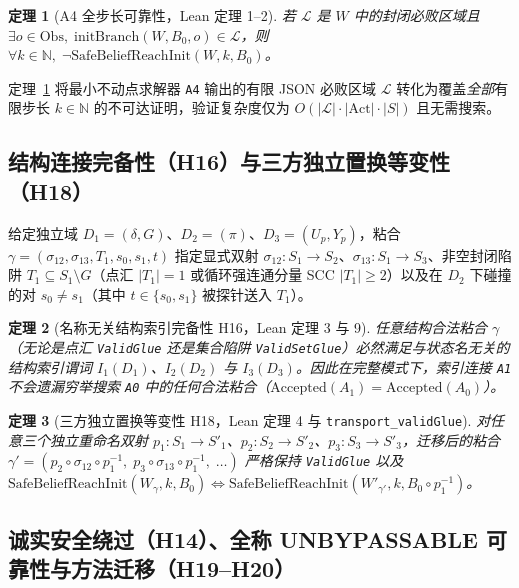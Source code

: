 \documentclass[10pt,a4paper]{article}
\newcommand{\code}[1]{\nolinkurl{#1}}
\newtheorem{theorem}{定理}[section]
\begin{document}
\begin{theorem}[A4 全步长可靠性，Lean 定理 1--2]\label{thm:a4}
若 $\mathcal{L}$ 是 $W$ 中的封闭必败区域且 $\exists o \in \mathrm{Obs},\; \mathrm{initBranch}(W, B_0, o) \in \mathcal{L}$，则 $\forall k \in \mathbb{N},\; \neg\mathrm{SafeBeliefReachInit}(W, k, B_0)$。
\end{theorem}

定理~\ref{thm:a4} 将最小不动点求解器 \code{A4} 输出的有限 JSON 必败区域 $\mathcal{L}$ 转化为覆盖\emph{全部}有限步长 $k \in \mathbb{N}$ 的不可达证明，验证复杂度仅为 $O(|\mathcal{L}|\cdot|\mathrm{Act}|\cdot|S|)$ 且无需搜索。

\subsection{结构连接完备性（H16）与三方独立置换等变性（H18）}

给定独立域 $D_1 = (\delta, G)$、$D_2 = (\pi)$、$D_3 = (U_p, Y_p)$，粘合 $\gamma = (\sigma_{12}, \sigma_{13}, T_1, s_0, s_1, t)$ 指定显式双射 $\sigma_{12}: S_1 \to S_2$、$\sigma_{13}: S_1 \to S_3$、非空封闭陷阱 $T_1 \subseteq S_1 \setminus G$（点汇 $|T_1|=1$ 或循环强连通分量 SCC $|T_1| \ge 2$）以及在 $D_2$ 下碰撞的对 $s_0 \ne s_1$（其中 $t \in \{s_0, s_1\}$ 被探针送入 $T_1$）。

\begin{theorem}[名称无关结构索引完备性 H16，Lean 定理 3 与 9]\label{thm:h16}
任意结构合法粘合 $\gamma$（无论是点汇 \code{ValidGlue} 还是集合陷阱 \code{ValidSetGlue}）必然满足与状态名无关的结构索引谓词 $I_1(D_1)$、$I_2(D_2)$ 与 $I_3(D_3)$。因此在完整模式下，索引连接 \code{A1} 不会遗漏穷举搜索 \code{A0} 中的任何合法粘合（$\mathrm{Accepted}(A_1) = \mathrm{Accepted}(A_0)$）。
\end{theorem}

\begin{theorem}[三方独立置换等变性 H18，Lean 定理 4 与 \code{transport_validGlue}]\label{thm:h18}
对任意三个\emph{独立}重命名双射 $p_1: S_1 \to S'_1$、$p_2: S_2 \to S'_2$、$p_3: S_3 \to S'_3$，迁移后的粘合 $\gamma' = (p_2 \circ \sigma_{12} \circ p_1^{-1},\; p_3 \circ \sigma_{13} \circ p_1^{-1},\; \dots)$ 严格保持 \code{ValidGlue} 以及 $\mathrm{SafeBeliefReachInit}(W_\gamma, k, B_0) \iff \mathrm{SafeBeliefReachInit}(W'_{\gamma'}, k, B_0 \circ p_1^{-1})$。
\end{theorem}

\subsection{诚实安全绕过（H14）、全称 UNBYPASSABLE 可靠性与方法迁移（H19--H20）}
\end{document}
